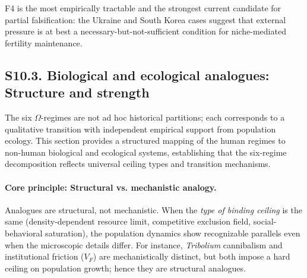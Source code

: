 \documentclass[11pt]{article}
\begin{document}
F4 is the most empirically tractable and the strongest current candidate for partial falsification: the Ukraine and South Korea cases suggest that external pressure is at best a necessary-but-not-sufficient condition for niche-mediated fertility maintenance.

\subsection*{S10.3. Biological and ecological analogues: Structure and strength}

The six $\Omega$-regimes are not ad hoc historical partitions; each corresponds to a qualitative transition
with independent empirical support from population ecology. This section provides a structured mapping
of the human regimes to non-human biological and ecological systems, establishing that the six-regime
decomposition reflects universal ceiling types and transition mechanisms.

\paragraph{Core principle: Structural vs. mechanistic analogy.}
Analogues are structural, not mechanistic. When the \emph{type of binding ceiling} is the same (density-dependent
resource limit, competitive exclusion field, social-behavioral saturation), the population dynamics show
recognizable parallels even when the microscopic details differ. For instance, \textit{Tribolium} cannibalism
and institutional friction ($V_F$) are mechanistically distinct, but both impose a hard ceiling on population
growth; hence they are structural analogues.
\end{document}
